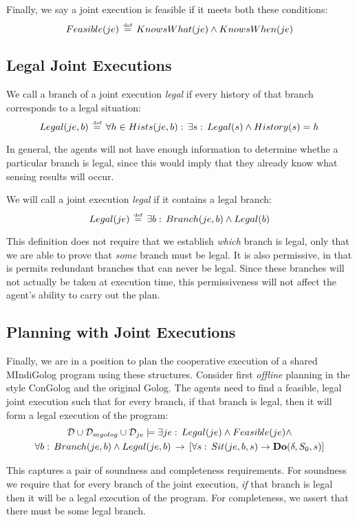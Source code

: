Finally, we say a joint execution is feasible if it meets both these
conditions:\[
Feasible(je)\,\stackrel{\mbox{\tiny def}}{=}\, KnowsWhat(je)\wedge KnowsWhen(je)\]



\subsection{Legal Joint Executions}

We call a branch of a joint execution \emph{legal} if every history
of that branch corresponds to a legal situation:\[
Legal(je,b)\,\stackrel{\mbox{\tiny def}}{=}\,\forall h\in Hists(je,b):\,\exists s:\, Legal(s)\wedge History(s)=h\]


In general, the agents will not have enough information to determine
whethe a particular branch is legal, since this would imply that they
already know what sensing results will occur.

We will call a joint execution \emph{legal} if it contains a legal
branch:\[
Legal(je)\,\stackrel{\mbox{\tiny def}}{=}\,\exists b:\, Branch(je,b)\wedge Legal(b)\]


This definition does not require that we establish \emph{which} branch
is legal, only that we are able to prove that \emph{some} branch must
be legal. It is also permissive, in that is permits redundant branches
that can never be legal. Since these branches will not actually be
taken at execution time, this permissiveness will not affect the agent's
ability to carry out the plan.


\subsection{Planning with Joint Executions}

Finally, we are in a position to plan the cooperative execution of
a shared MIndiGolog program using these structures. Consider first
\emph{offline} planning in the style ConGolog and the original Golog.
The agents need to find a feasible, legal joint execution such that
for every branch, if that branch is legal, then it will form a legal
execution of the program:\begin{multline*}
\mathcal{D}\cup\mathcal{D}_{mgolog}\cup\mathcal{D}_{je}\models\exists je:\, Legal(je)\wedge Feasible(je)\wedge\\
\forall b:\, Branch(je,b)\wedge Legal(je,b)\,\rightarrow\,\left[\forall s:\, Sit(je,b,s)\rightarrow\mathbf{Do}(\delta,S_{0},s)\right]\end{multline*}


This captures a pair of soundness and completeness requirements. For
soundness we require that for every branch of the joint execution,
\emph{if} that branch is legal then it will be a legal execution of
the program. For completeness, we assert that there must be some legal
branch.


